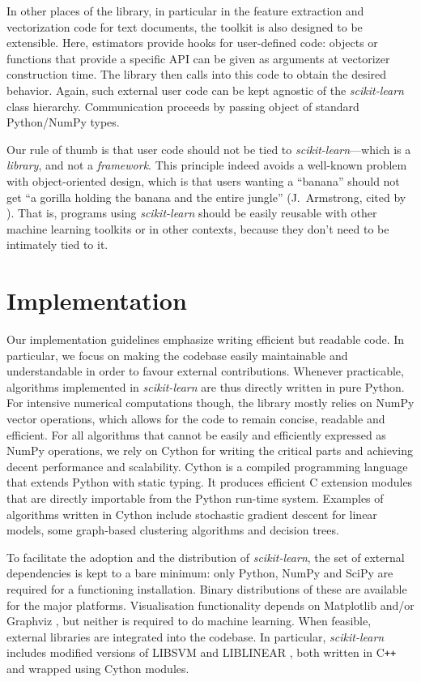 \documentclass{llncs}
\newcommand{\sklearn}{\textit{scikit-learn}\xspace}
\begin{document}
In other places of the library, in particular in the feature extraction and
vectorization code for text documents, the toolkit is also designed to be
extensible. Here, estimators provide hooks for user-defined code: objects or
functions that provide a specific API can be given as arguments at vectorizer
construction time. The library then calls into this code to obtain the desired
behavior. Again, such external user code can be kept agnostic of the \sklearn
class hierarchy.
Communication proceeds by passing object of standard Python/NumPy types.

Our rule of thumb is that user code should not be tied to \sklearn---which is a
\textit{library}, and not a \textit{framework}. This principle indeed avoids a
well-known problem with object-oriented design, which is that users wanting a
``banana'' should not get ``a gorilla holding the banana and the entire jungle''
(J.~Armstrong, cited by \citealp[p.~213]{seibel2009coders}).  That is, programs
using \sklearn should be easily reusable with other machine learning toolkits or
in other contexts, because they don't need to be intimately tied to it.


\section{Implementation}
\label{sec:implementation}

Our implementation guidelines emphasize writing efficient but readable code.
In particular, we focus on making the codebase easily maintainable and
understandable in order to favour external contributions. Whenever practicable,
algorithms implemented in \sklearn are thus directly written in pure Python. For
intensive numerical computations though, the library mostly relies on NumPy
vector operations, which allows for the code to remain concise, readable and
efficient. For all algorithms that cannot be easily and efficiently expressed as
NumPy operations, we rely on Cython \citep{behnel2011cython}  for writing the
critical parts and achieving decent performance and scalability. Cython is a
compiled programming language that extends Python with static typing. It
produces efficient C extension modules that are directly importable from the
Python run-time system. Examples of algorithms written in Cython include
stochastic gradient descent for linear models, some graph-based clustering
algorithms and decision trees.

To facilitate the adoption and the distribution of \sklearn,
the set of external dependencies is kept to a bare minimum:
only Python, NumPy and SciPy are required for a functioning installation.
Binary distributions of these are available for the major platforms.
Visualisation functionality depends on Matplotlib \citep{hunter2007matplotlib}
and/or Graphviz \citep{gansner2000},
but neither is required to do machine learning.
When feasible, external libraries are integrated into the codebase.
In particular, \sklearn includes modified versions of \textsf{LIBSVM} and \textsf{LIBLINEAR}
\citep{chang2011libsvm,fan2008}, both written in C{}\verb!++!
and wrapped using Cython modules.
\end{document}
